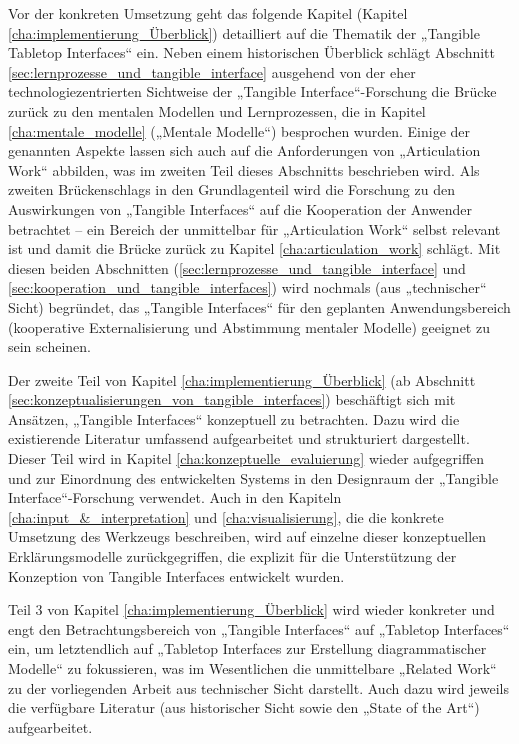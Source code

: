Vor der konkreten Umsetzung geht das folgende Kapitel (Kapitel \ref{cha:implementierung_Überblick}) detailliert auf die Thematik der „Tangible Tabletop Interfaces“ ein. Neben einem historischen Überblick schlägt Abschnitt \ref{sec:lernprozesse_und_tangible_interface} ausgehend von der eher technologiezentrierten Sichtweise der „Tangible Interface“-Forschung die Brücke zurück zu den mentalen Modellen und Lernprozessen, die in Kapitel \ref{cha:mentale_modelle} („Mentale Modelle“) besprochen wurden. Einige der genannten Aspekte lassen sich auch auf die Anforderungen von „Articulation Work“ abbilden, was im zweiten Teil dieses Abschnitts beschrieben wird. Als zweiten Brückenschlags in den Grundlagenteil wird die Forschung zu den Auswirkungen von „Tangible Interfaces“ auf die Kooperation der Anwender betrachtet -- ein Bereich der unmittelbar für „Articulation Work“ selbst relevant ist und damit die Brücke zurück zu Kapitel \ref{cha:articulation_work} schlägt. Mit diesen beiden Abschnitten (\ref{sec:lernprozesse_und_tangible_interface} und \ref{sec:kooperation_und_tangible_interfaces}) wird nochmals (aus „technischer“ Sicht) begründet, das „Tangible Interfaces“ für den geplanten Anwendungsbereich (kooperative Externalisierung und Abstimmung mentaler Modelle) geeignet zu sein scheinen.

Der zweite Teil von Kapitel \ref{cha:implementierung_Überblick} (ab Abschnitt \ref{sec:konzeptualisierungen_von_tangible_interfaces}) beschäftigt sich mit Ansätzen, „Tangible Interfaces“ konzeptuell zu betrachten. Dazu wird die existierende Literatur umfassend aufgearbeitet und strukturiert dargestellt. Dieser Teil wird in Kapitel \ref{cha:konzeptuelle_evaluierung} wieder aufgegriffen und zur Einordnung des entwickelten Systems in den Designraum der „Tangible Interface“-Forschung verwendet. Auch in den Kapiteln \ref{cha:input_&_interpretation} und \ref{cha:visualisierung}, die die konkrete Umsetzung des Werkzeugs beschreiben, wird auf einzelne dieser konzeptuellen Erklärungsmodelle zurückgegriffen, die explizit für die Unterstützung der Konzeption von Tangible Interfaces entwickelt wurden.

Teil 3 von Kapitel \ref{cha:implementierung_Überblick} wird wieder konkreter und engt den Betrachtungsbereich von „Tangible Interfaces“ auf „Tabletop Interfaces“ ein, um letztendlich auf „Tabletop Interfaces zur Erstellung diagrammatischer Modelle“ zu fokussieren, was im Wesentlichen die unmittelbare „Related Work“ zu der vorliegenden Arbeit aus technischer Sicht darstellt. Auch dazu wird jeweils die verfügbare Literatur (aus historischer Sicht sowie den „State of the Art“) aufgearbeitet.

